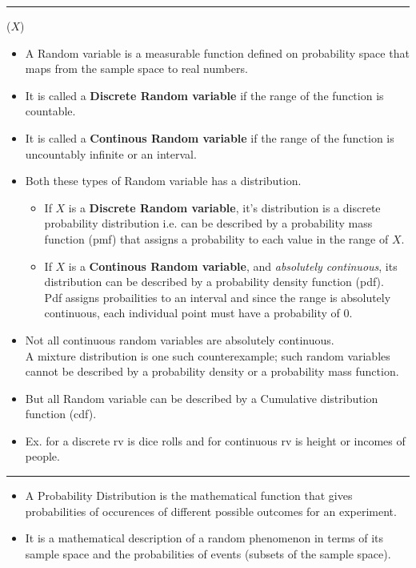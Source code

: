 \documentclass[	DIV=calc,%
paper=a4,%
fontsize=11pt,%
twocolumn]{scrartcl} %
\newcommand{\hformbar}[1]{\vspace{5pt}\hrule\vspace{10pt}} %
\newcommand{\formdesc}[1]{\noindent\textbf{#1}}
\begin{document}
\newpage
\hformbar
\formdesc{Random variable:} ($X$)

\begin{itemize}
	\item A Random variable is a measurable function defined on probability space that maps from the sample space to real numbers.
	\item It is called a \textbf{Discrete Random variable} if the range of the function is countable.
	\item It is called a \textbf{Continous Random variable} if the range of the function is uncountably infinite or an interval.
	\item Both these types of  Random variable has a distribution.
		\begin{itemize}
			\item If $X$ is a \textbf{Discrete Random variable}, it's distribution is a discrete probability distribution i.e. can be described by a probability mass function (pmf) that assigns a probability to each value in the range of  $X$.
			\item If $X$ is a \textbf{Continous Random variable}, and \emph{absolutely continuous}, its distribution can be described by a probability density function (pdf).\\ Pdf assigns probailities to an interval and since the range is absolutely continuous, each individual point must have a probability of 0.
		\end{itemize}
	\item Not all continuous random variables are absolutely continuous.\\ A mixture distribution is one such counterexample; such random variables cannot be described by a probability density or a probability mass function. 
	\item But all Random variable can be described by a Cumulative distribution function (cdf).
	\item Ex. for a discrete rv is dice rolls and for continuous rv is height or incomes of people.
\end{itemize}


\hformbar
\formdesc{Probability Distribution:}

\begin{itemize}
	\item A Probability Distribution is  the mathematical function that gives probabilities of occurences of different possible outcomes for an experiment.
	\item It is a mathematical description of a random phenomenon in terms of its  sample space and the probabilities of events (subsets of the sample space).
\end{itemize}
\end{document}
